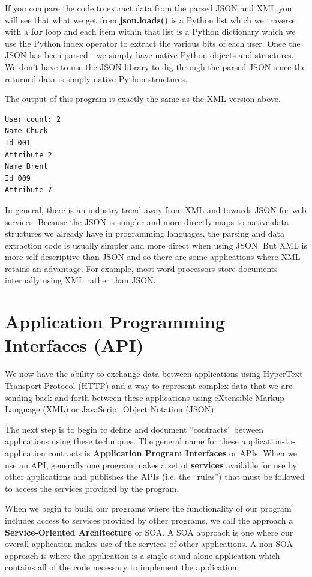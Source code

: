 \documentclass[11pt]{book}
\begin{document}
If you compare the code to extract data from the parsed JSON and XML
you will see that what we get from {\bf json.loads()} 
is a Python list which we traverse with 
a {\bf for} loop and each item within that list
is a Python dictionary which we use the Python
index operator to extract the various bits of each user.   Once the JSON has
been parsed - we simply have native Python objects and structures.  We don't
have to use the JSON library to dig through the parsed JSON since the returned
data is simply native Python structures.

The output of this program is exactly the same as the XML version above.

\beforeverb
\begin{verbatim}
User count: 2
Name Chuck
Id 001
Attribute 2
Name Brent
Id 009
Attribute 7
\end{verbatim}
\afterverb
%
In general, there is an industry trend away from XML and towards JSON for 
web services.  Because the JSON is simpler and more directly maps to native 
data structures we already have in programming languages, the parsing 
and data extraction code is usually simpler and more direct when using JSON.
But XML is more self-descriptive than JSON and so there are 
some applications where XML retains an advantage.  For example, most word 
processors store documents internally using XML rather than JSON.

\section{Application Programming Interfaces (API)}

We now have the ability to exchange data between applications using HyperText
Transport Protocol (HTTP) and a way to represent complex data that we are 
sending back and forth between these applications using eXtensible 
Markup Language (XML) or JavaScript Object Notation (JSON).

The next step is to begin to define and document ``contracts'' between 
applications using these techniques. The general name for these 
application-to-application contracts is {\bf Application Program 
Interfaces} or APIs.  When we use an API, generally one program
makes a set of {\bf services} available for use by other applications
and publishes the APIs (i.e. the ``rules'') that must be followed to 
access the services provided by the program.

When we begin to build our programs where the functionality of
our program includes access to services provided by other programs, 
we call the approach a {\bf Service-Oriented Architecture} or SOA.
A SOA approach is one where our overall application makes use of 
the services of other applications.  A non-SOA approach is where the
application is a single stand-alone application which contains all of the
code necessary to implement the application.
\end{document}
